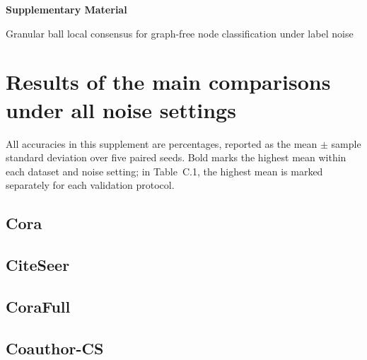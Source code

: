 \documentclass[10pt,letterpaper,nopreprintline]{elsarticle}
\begin{document}
\begin{center}{\Large\bfseries Supplementary Material}\par\medskip Granular ball local consensus for graph-free node classification under label noise\end{center}

\appendix
\renewcommand{\thetable}{\Alph{section}.\arabic{table}}
\renewcommand{\theHtable}{\Alph{section}.\arabic{table}}

\FloatBarrier

\setcounter{table}{0}

\section{Results of the main comparisons under all noise settings}\label{sec:A}

All accuracies in this supplement are percentages, reported as the mean \(\pm\) sample standard deviation over five paired seeds. Bold marks the highest mean within each dataset and noise setting; in Table~C.1, the highest mean is marked separately for each validation protocol.

\Needspace{120pt}

\subsection{Cora}\label{sec:A.1}



\Needspace{120pt}

\subsection{CiteSeer}\label{sec:A.2}



\Needspace{120pt}

\subsection{CoraFull}\label{sec:A.3}



\Needspace{120pt}

\subsection{Coauthor-CS}\label{sec:A.4}


\end{document}
